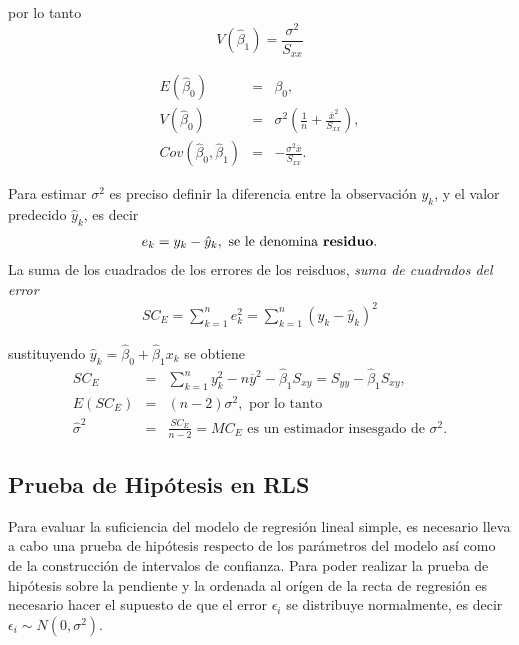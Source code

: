 \begin{itemize}
\begin{enumerate}
por lo tanto
\begin{equation}\label{Varianza.Beta.1}
V\left(\hat{\beta}_{1}\right)=\frac{\sigma^{2}}{S_{xx}}
\end{equation}
\begin{Prop}
\begin{eqnarray*}
E\left(\hat{\beta}_{0}\right)&=&\beta_{0},\\
V\left(\hat{\beta}_{0}\right)&=&\sigma^{2}\left(\frac{1}{n}+\frac{\overline{x}^{2}}{S_{xx}}\right),\\
Cov\left(\hat{\beta}_{0},\hat{\beta}_{1}\right)&=&-\frac{\sigma^{2}\overline{x}}{S_{xx}}.
\end{eqnarray*}
\end{Prop}

Para estimar $\sigma^{2}$ es preciso definir la diferencia entre la observaci\'on $y_{k}$, y el valor predecido $\hat{y}_{k}$, es decir
\begin{eqnarray*}
e_{k}=y_{k}-\hat{y}_{k},\textrm{ se le denomina \textbf{residuo}.}
\end{eqnarray*}
La suma de los cuadrados de los errores de los reisduos, \textit{suma de cuadrados del error}
\begin{eqnarray}
SC_{E}=\sum_{k=1}^{n}e_{k}^{2}=\sum_{k=1}^{n}\left(y_{k}-\hat{y}_{k}\right)^{2}
\end{eqnarray}

sustituyendo $\hat{y}_{k}=\hat{\beta}_{0}+\hat{\beta}_{1}x_{k}$ se obtiene
\begin{eqnarray*}
SC_{E}&=&\sum_{k=1}^{n}y_{k}^{2}-n\overline{y}^{2}-\hat{\beta}_{1}S_{xy}=S_{yy}-\hat{\beta}_{1}S_{xy},\\
E\left(SC_{E}\right)&=&\left(n-2\right)\sigma^{2},\textrm{ por lo tanto}\\
\hat{\sigma}^{2}&=&\frac{SC_{E}}{n-2}=MC_{E}\textrm{ es un estimador insesgado de }\sigma^{2}.
\end{eqnarray*}

\subsection*{Prueba de Hip\'otesis en RLS}

Para evaluar la suficiencia del modelo de regresi\'on lineal simple, es necesario lleva a cabo una prueba de hip\'otesis respecto de los par\'ametros del modelo as\'i como de la construcci\'on de intervalos de confianza. Para poder realizar la prueba de hip\'otesis sobre la pendiente y la ordenada al or\'igen de la recta de regresi\'on es necesario hacer el supuesto de que el error $\epsilon_{i}$ se distribuye normalmente, es decir $\epsilon_{i} \sim N\left(0,\sigma^{2}\right)$.


\end{enumerate}
\end{itemize}
